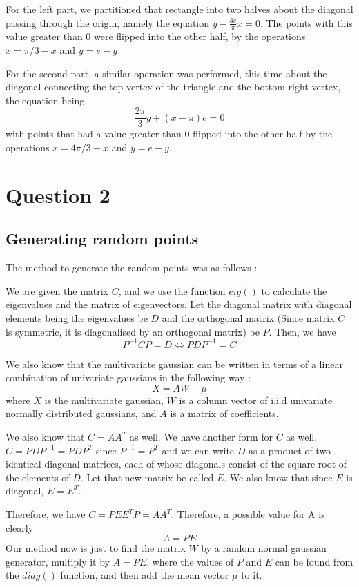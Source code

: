 \documentclass{article}
\begin{document}
For the left part, we partitioned that rectangle into two halves about the diagonal passing through the origin, namely the equation $y - \frac{3e}{\pi} x = 0$. The points with this value greater than 0 were flipped into the other half, by the operations $x = \pi/3 - x$ and $y = e - y$

For the second part, a similar operation was performed, this time about the diagonal connecting the top vertex of the triangle and the bottom right vertex, the equation being \[ \frac{2\pi}{3}y + (x-\pi)e = 0 \] with points that had a value greater than 0 flipped into the other half by the operations $x = 4\pi/3 - x$ and $y = e - y$.


\section{Question 2}

\subsection{Generating random points}

The method to generate the random points was as follows : 

We are given the matrix $C$, and we use the function $eig()$ to calculate the eigenvalues and the matrix of eigenvectors. Let the diagonal matrix with diagonal elements being the eigenvalues be $D$ and the orthogonal matrix (Since matrix $C$ is symmetric, it is diagonalised by an orthogonal matrix) be $P$. Then, we have \[ P^{-1}CP = D \iff PDP^{-1} = C \]

We also know that the multivariate gaussian can be written in terms of a linear combination of univariate gaussians in the following way : \[ X = AW + \mu\] where $X$ is the multivariate gaussian, $W$ is a column vector of i.i.d univariate normally distributed gaussians, and $A$ is a matrix of coefficients. 

We also know that $C = AA^{T}$ as well. We have another form for $C$ as well, $C = PDP^{-1} = PDP^{T}$ since $P^{-1} = P^T$ and we can write $D$ as a product of two identical diagonal matrices, each of whose diagonals consist of the square root of the elements of $D$. Let that new matrix be called $E$. We also know that since $E$ is diagonal, $E = E^T$.

Therefore, we have $C = PEE^TP = AA^T$. Therefore, a possible value for A is clearly \[ A = PE \] Our method now is just to find the matrix $W$ by a random normal gaussian generator, multiply it by $A = PE$, where the values of $P$ and $E$ can be found from the $diag()$ function, and then add the mean vector $\mu$ to it. 
\end{document}
